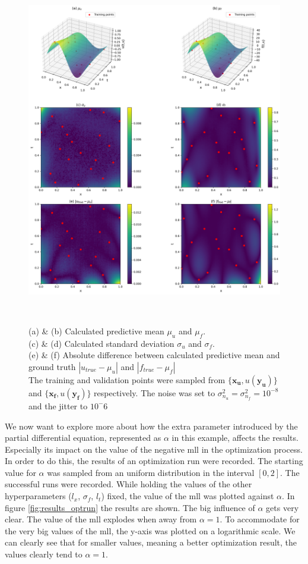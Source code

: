 \documentclass{article}
\begin{document}
\begin{figure}
    \centering
    \includegraphics[width=1\textwidth]{../final_examples/heat_equation/merged_plots.png}
    \caption{(a) \& (b) Calculated predictive mean $\mu_u$ and $\mu_f$.\\ 
    (c) \& (d) Calculated standard deviation $\sigma_{u}$ and $\sigma_f$.\\
    (e) \& (f) Absolute difference between calculated predictive mean and ground truth $|u_{true}-\mu_u|$ and $|f_{true}-\mu_f|$\\
    The training and validation points were sampled from $\{\bm{x_u},u(\bm{y_u})\}$ and $\{\bm{x_f},u(\bm{y_f})\}$ respectively. The noise was set to $\sigma_{n_u}^2 = \sigma_{n_f}^2 = 10^{-8}$ and the jitter to $10^-6$}
    ~\label{fig:results_heatequation}
\end{figure}
We now want to explore more about how the extra parameter introduced by the partial differential equation, represented as $\alpha$ in this example, affects the results. Especially its impact on the value of the negative mll in the optimization process. In order to do this, the results of an optimization run were recorded. The starting value for $\alpha$ was sampled from an uniform distribution in the interval $\left[0,2 \right]$. The successful runs were recorded. While holding the values of the other hyperparameters ($l_x$, $\sigma_f$, $l_t$) fixed, the value of the mll was plotted against $\alpha$. In figure \ref{fig:results_optrun} the results are shown. The big influence of $\alpha$ gets very clear. The value of the mll explodes when away from $\alpha = 1$. To accommodate for the very big values of the mll, the y-axis was plotted on a logarithmic scale. We can clearly see that for smaller values, meaning a better optimization result, the values clearly tend to $\alpha = 1$.
\end{document}
